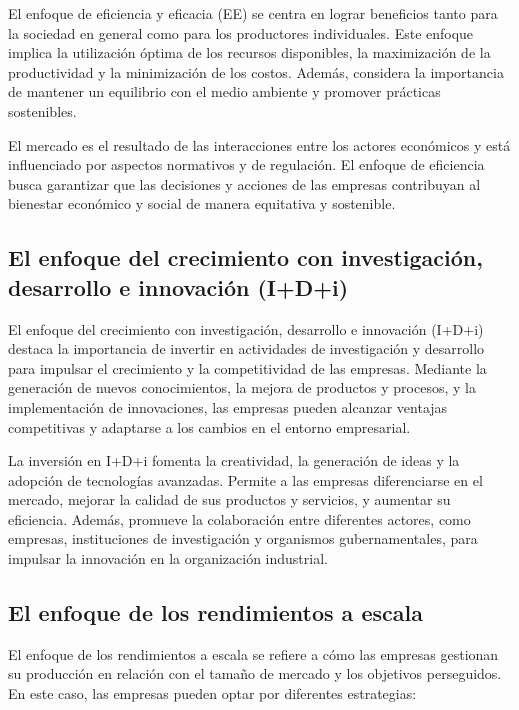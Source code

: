 \documentclass[
  letterpaper,
  DIV=11,
  numbers=noendperiod]{scrartcl}
\begin{document}
El enfoque de eficiencia y eficacia (EE) se centra en lograr beneficios
tanto para la sociedad en general como para los productores
individuales. Este enfoque implica la utilización óptima de los recursos
disponibles, la maximización de la productividad y la minimización de
los costos. Además, considera la importancia de mantener un equilibrio
con el medio ambiente y promover prácticas sostenibles.

El mercado es el resultado de las interacciones entre los actores
económicos y está influenciado por aspectos normativos y de regulación.
El enfoque de eficiencia busca garantizar que las decisiones y acciones
de las empresas contribuyan al bienestar económico y social de manera
equitativa y sostenible.

\hypertarget{el-enfoque-del-crecimiento-con-investigaciuxf3n-desarrollo-e-innovaciuxf3n-idi}{%
\subsection{El enfoque del crecimiento con investigación, desarrollo e
innovación
(I+D+i)}\label{el-enfoque-del-crecimiento-con-investigaciuxf3n-desarrollo-e-innovaciuxf3n-idi}}

El enfoque del crecimiento con investigación, desarrollo e innovación
(I+D+i) destaca la importancia de invertir en actividades de
investigación y desarrollo para impulsar el crecimiento y la
competitividad de las empresas. Mediante la generación de nuevos
conocimientos, la mejora de productos y procesos, y la implementación de
innovaciones, las empresas pueden alcanzar ventajas competitivas y
adaptarse a los cambios en el entorno empresarial.

La inversión en I+D+i fomenta la creatividad, la generación de ideas y
la adopción de tecnologías avanzadas. Permite a las empresas
diferenciarse en el mercado, mejorar la calidad de sus productos y
servicios, y aumentar su eficiencia. Además, promueve la colaboración
entre diferentes actores, como empresas, instituciones de investigación
y organismos gubernamentales, para impulsar la innovación en la
organización industrial.

\hypertarget{el-enfoque-de-los-rendimientos-a-escala}{%
\subsection{El enfoque de los rendimientos a
escala}\label{el-enfoque-de-los-rendimientos-a-escala}}

El enfoque de los rendimientos a escala se refiere a cómo las empresas
gestionan su producción en relación con el tamaño de mercado y los
objetivos perseguidos. En este caso, las empresas pueden optar por
diferentes estrategias:
\end{document}
